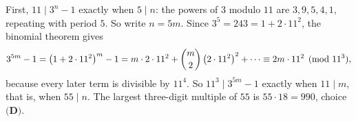 First, $11\mid3^n-1$ exactly when $5\mid n$: the powers of $3$ modulo $11$ are $3,9,5,4,1$, repeating with period $5$. So write $n=5m$. Since $3^5=243=1+2\cdot11^2$, the binomial theorem gives
\[
3^{5m}-1=\left(1+2\cdot11^2\right)^m-1=m\cdot2\cdot11^2+\dbinom m2\left(2\cdot11^2\right)^2+\cdots\equiv2m\cdot11^2\pmod{11^3},
\]
because every later term is divisible by $11^4$. So $11^3\mid3^{5m}-1$ exactly when $11\mid m$, that is, when $55\mid n$. The largest three-digit multiple of $55$ is $55\cdot18=\boxed{990}$, choice $\textbf{(D)}$.

